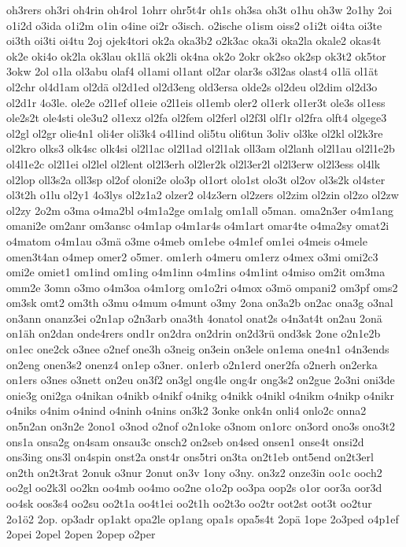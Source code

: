 {oh3rers
oh3ri
oh4rin
oh4rol
1ohrr
ohr5t4r
oh1s
oh3sa
oh3t
o1hu
oh3w
2o1hy
2oi
o1i2d
o3ida
o1i2m
o1in
o4ine
oi2r
o3isch.
o2ische
o1ism
oiss2
o1i2t
oi4ta
oi3te
oi3th
oi3ti
oi4tu
2oj
ojek4tori
ok2a
oka3b2
o2k3ac
oka3i
oka2la
okale2
okas4t
ok2e
oki4o
ok2la
ok3lau
ok1lä
ok2li
ok4na
ok2o
2okr
ok2so
ok2sp
ok3t2
ok5tor
3okw
2ol
o1la
ol3abu
olaf4
ol1ami
ol1ant
ol2ar
olar3s
o3l2as
olast4
o1lä
ol1ät
ol2chr
ol4d1am
ol2dä
ol2d1ed
ol2d3eng
old3ersa
olde2s
ol2deu
ol2dim
ol2d3o
ol2d1r
4o3le.
ole2e
o2l1ef
ol1eie
o2l1eis
ol1emb
oler2
ol1erk
ol1er3t
ole3s
ol1ess
ole2s2t
ole4sti
ole3u2
ol1exz
ol2fa
ol2fem
ol2ferl
ol2f3l
olf1r
ol2fra
olft4
olgege3
ol2gl
ol2gr
olie4n1
oli4er
oli3k4
o4l1ind
oli5tu
oli6tun
3oliv
ol3ke
ol2kl
ol2k3re
ol2kro
olks3
olk4sc
olk4si
ol2l1ac
ol2l1ad
ol2l1ak
oll3am
ol2lanh
ol2l1au
ol2l1e2b
ol4l1e2c
ol2l1ei
ol2lel
ol2lent
ol2l3erh
ol2ler2k
ol2l3er2l
ol2l3erw
ol2l3ess
ol4lk
ol2lop
oll3s2a
oll3sp
ol2of
oloni2e
olo3p
ol1ort
olo1st
olo3t
ol2ov
ol3s2k
ol4ster
ol3t2h
o1lu
ol2y1
4o3lys
ol2z1a2
olzer2
ol4z3ern
ol2zers
ol2zim
ol2zin
ol2zo
ol2zw
ol2zy
2o2m
o3ma
o4ma2bl
o4m1a2ge
om1alg
om1all
o5man.
oma2n3er
o4m1ang
omani2e
om2anr
om3ansc
o4m1ap
o4m1ar4s
o4m1art
omar4te
o4ma2sy
omat2i
o4matom
o4m1au
o3mä
o3me
o4meb
om1ebe
o4m1ef
om1ei
o4meis
o4mele
omen3t4an
o4mep
omer2
o5mer.
om1erh
o4meru
om1erz
o4mex
o3mi
omi2c3
omi2e
omiet1
om1ind
om1ing
o4m1inn
o4m1ins
o4m1int
o4miso
om2it
om3ma
omm2e
3omn
o3mo
o4m3oa
o4m1org
om1o2ri
o4mox
o3mö
ompani2
om3pf
oms2
om3sk
omt2
om3th
o3mu
o4mum
o4munt
o3my
2ona
on3a2b
on2ac
ona3g
o3nal
on3ann
onanz3ei
o2n1ap
o2n3arb
ona3th
4onatol
onat2s
o4n3at4t
on2au
2onä
on1äh
on2dan
onde4rers
ond1r
on2dra
on2drin
on2d3rü
ond3sk
2one
o2n1e2b
on1ec
one2ck
o3nee
o2nef
one3h
o3neig
on3ein
on3ele
on1ema
one4n1
o4n3ends
on2eng
onen3s2
onenz4
on1ep
o3ner.
on1erb
o2n1erd
oner2fa
o2nerh
on2erka
on1ers
o3nes
o3nett
on2eu
on3f2
on3gl
ong4le
ong4r
ong3s2
on2gue
2o3ni
oni3de
onie3g
oni2ga
o4nikan
o4nikb
o4nikf
o4nikg
o4nikk
o4nikl
o4nikm
o4nikp
o4nikr
o4niks
o4nim
o4nind
o4ninh
o4nins
on3k2
3onke
onk4n
onli4
onlo2c
onna2
on5n2an
on3n2e
2ono1
o3nod
o2nof
o2n1oke
o3nom
on1orc
on3ord
ono3s
ono3t2
ons1a
onsa2g
on4sam
onsau3c
onsch2
on2seb
on4sed
onsen1
onse4t
onsi2d
ons3ing
ons3l
on4spin
onst2a
onst4r
ons5tri
on3ta
on2t1eb
ont5end
on2t3erl
on2th
on2t3rat
2onuk
o3nur
2onut
on3v
1ony
o3ny.
on3z2
onze3in
oo1c
ooch2
oo2gl
oo2k3l
oo2kn
oo4mb
oo4mo
oo2ne
o1o2p
oo3pa
oop2s
o1or
oor3a
oor3d
oo4sk
oos3s4
oo2su
oo2t1a
oo4t1ei
oo2t1h
oo2t3o
oo2tr
oot2st
oot3t
oo2tur
2o1ö2
2op.
op3adr
op1akt
opa2le
op1ang
opa1s
opa5s4t
2opä
1ope
2o3ped
o4p1ef
2opei
2opel
2open
2opep
o2per
}
